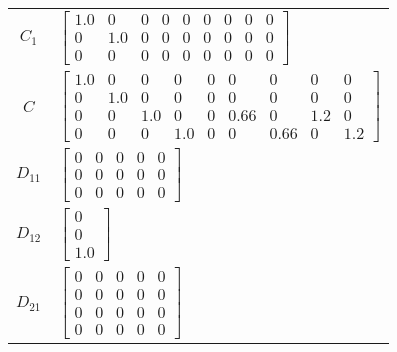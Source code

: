 \begin{tabular}{cl}
 $C_{1}$  & $\left[\begin{matrix}1.0 & 0 & 0 & 0 & 0 & 0 & 0 & 0 & 0\\0 & 1.0 & 0 & 0 & 0 & 0 & 0 & 0 & 0\\0 & 0 & 0 & 0 & 0 & 0 & 0 & 0 & 0\end{matrix}\right]$                                                                                                                                                                                                                                                                           \\
   $C$    & $\left[\begin{matrix}1.0 & 0 & 0 & 0 & 0 & 0 & 0 & 0 & 0\\0 & 1.0 & 0 & 0 & 0 & 0 & 0 & 0 & 0\\0 & 0 & 1.0 & 0 & 0 & 0.66 & 0 & 1.2 & 0\\0 & 0 & 0 & 1.0 & 0 & 0 & 0.66 & 0 & 1.2\end{matrix}\right]$                                                                                                                                                                                                                          \\
 $D_{11}$ & $\left[\begin{matrix}0 & 0 & 0 & 0 & 0\\0 & 0 & 0 & 0 & 0\\0 & 0 & 0 & 0 & 0\end{matrix}\right]$                                                                                                                                                                                                                                                                                                                               \\
 $D_{12}$ & $\left[\begin{matrix}0\\0\\1.0\end{matrix}\right]$                                                                                                                                                                                                                                                                                                                                                                             \\
 $D_{21}$ & $\left[\begin{matrix}0 & 0 & 0 & 0 & 0\\0 & 0 & 0 & 0 & 0\\0 & 0 & 0 & 0 & 0\\0 & 0 & 0 & 0 & 0\end{matrix}\right]$                                                                                                                                                                                                                                                                                                            \\
\hline
\end{tabular}
